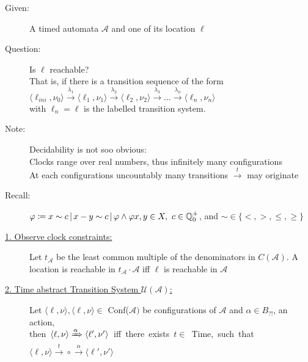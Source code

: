\begin{tcolorbox}[colback=kapiteleins!5!white, colframe=orange!75!black, title=\textbf{Location Reachability / The Region Automata}, left=0mm, right=0mm, top=0mm, bottom=0mm]
\begin{description}
\item[Given:] A timed automata $\mathcal{A}$ and one of its location $\ell$
\item[Question:] Is $\ell$ reachable?\\That is, if there is a transition sequence of the form\\$\langle \ell_{ini}, \nu_0 \rangle \xrightarrow{\lambda_1} \langle \ell_1, \nu_1 \rangle \xrightarrow{\lambda_2} \langle \ell_2, \nu_2 \rangle \xrightarrow{\lambda_3} \ldots \xrightarrow{\lambda_n} \langle \ell_n, \nu_n \rangle$\\[0.1cm]
with $\ell_n = \ell$ is the labelled transition system.\\

\item[Note:] Decidability is not soo obvious:\\
Clocks range over real numbers, thus infinitely many configurations\\
At each configurations uncountably many transitions $\xrightarrow{t}$ may originate\\

\item[Recall:] $\varphi \coloneqq x \sim c \, \vert \, x-y \sim c \, \vert \, \varphi \land \varphi \hfill x,y \in X, ~ c \in \mathbb{Q}_0^+$, and $\sim \in \{<,>, \leq, \geq\}$\\

\item[\uline{1. Observe clock constraints:}] Let $t_{\mathcal{A}}$ be the least common multiple of the denominators in $C(\mathcal{A})$.
A location is reachable in $t_{\mathcal{A}} \cdot \mathcal{A}$ \hfill iff $\ell$ is reachable in $\mathcal{A}$\\

\item[\uline{2. Time abstract Transition System $\mathcal{U}(\mathcal{A})$:}] \hfill \newline
Let $\langle \ell, \nu \rangle, \langle \ell, \nu \rangle \in$ Conf($\mathcal{A})$ be configurations of $\mathcal{A}$ and $\alpha \in B_{?!}$, an action,\\
\mbox{then $\langle \ell, \nu \rangle \xRightarrow{\alpha} \langle \ell', \nu' \rangle$ iff there exists $t \in$ Time, such that $\langle \ell, \nu \rangle \xrightarrow{t} \circ \xrightarrow{\alpha} \langle \ell', \nu' \rangle$}\\


\end{description}
\end{tcolorbox}
